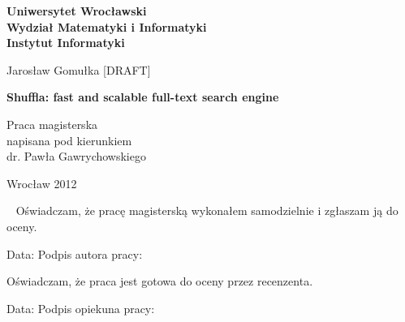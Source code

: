 \documentclass[10pt,a4paper]{article}
\begin{document}


\topmargin-20pt
\textwidth445pt

\begin{titlepage}
\Large

\begin{center}

\textbf{\large%
Uniwersytet Wrocławski\\
Wydział Matematyki i Informatyki\\
Instytut Informatyki}


\vspace{4cm}
Jarosław Gomułka [DRAFT]

\vspace{0.5cm}
\textbf{%
Shuffla: fast and scalable full-text search engine}

\end{center}

\vspace{7cm}
\begin{flushright}
\begin{minipage}[c]{6.2cm}
  Praca magisterska\\
  napisana pod kierunkiem\\
  dr. Pawła Gawrychowskiego
\end{minipage}
\end{flushright}

\vfill

\begin{center}
 Wrocław 2012
\end{center}

\newpage

\end{titlepage}

\newpage

\thispagestyle{empty}

\Large

~\vfill
Oświadczam, że pracę magisterską wykonałem samodzielnie i zgłaszam ją do oceny.

\vspace{2cm}
Data: \dotfill\quad Podpis autora pracy: \dotfill


\vspace{4cm}
Oświadczam, że praca jest gotowa do oceny przez recenzenta.

\vspace{2cm}
Data: \dotfill\quad Podpis opiekuna pracy: \dotfill
\end{document}
